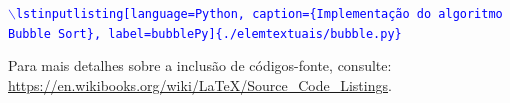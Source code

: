 \noindent\textcolor{blue}{\texttt{$\backslash$lstinputlisting[language=Python, caption=\{Implementação do algoritmo Bubble Sort\}, label=bubblePy]\{./elemtextuais/bubble.py\}}}



Para mais detalhes sobre a inclusão de códigos-fonte, consulte: \url{https://en.wikibooks.org/wiki/LaTeX/Source_Code_Listings}.



